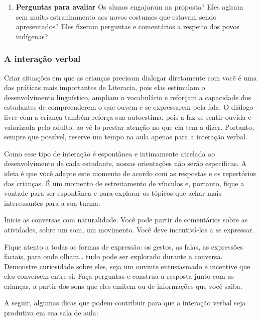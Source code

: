 \documentclass[11pt]{extarticle}
\begin{document}
\begin{enumerate}
\item \textbf{Perguntas para avaliar} Os alunos engajaram na proposta? 
Eles agiram sem muito estranhamento aos novos costumes que estavam sendo apresentados?
Eles fizeram perguntas e comentários a respeito dos povos indígenas?
\end{enumerate}

\subsubsection{A interação verbal} 
Criar situações em que as crianças precisam dialogar diretamente com 
você é uma das práticas mais importantes de Literacia, pois elas estimulam 
o desenvolvimento linguístico, ampliam o vocabulário e reforçam a 
capacidade dos estudantes de compreenderem o que ouvem e se expressarem 
pela fala. O diálogo livre com a criança também reforça sua autoestima, pois 
a faz se sentir ouvida e valorizada pelo adulto, ao vê-lo prestar atenção 
no que ela tem a dizer. Portanto, sempre que possível, reserve um tempo na 
aula apenas para a interação verbal. 

Como esse tipo de interação é espontânea e intimamente atrelada ao 
desenvolvimento de cada estudante, nossas orientações não serão específicas. 
A ideia é que você adapte este momento de acordo com as respostas e os 
repertórios das crianças. É um momento de estreitamento de vínculos e, portanto, 
fique a vontade para ser espontânea e para explorar os tópicos que achar 
mais interessantes para a sua turma.

Inicie as conversas com naturalidade. Você pode partir de comentários
sobre as atividades, sobre um som, um movimento. Você deve incentivá-los a 
se expressar.

Fique atento a todas as formas de expressão: os gestos, as falas, as 
expressões faciais, para onde olham\ldots{} tudo pode ser explorado durante a conversa. 
Demonstre curiosidade sobre eles, seja um ouvinte entusiasmado e incentive que eles 
conversem entre si. Faça perguntas e construa a resposta junto com as crianças, 
a partir dos sons que eles emitem ou de informações que você saiba. 

A seguir, algumas dicas que podem contribuir para que a interação verbal 
seja produtiva em sua sala de aula: 
\end{document}
